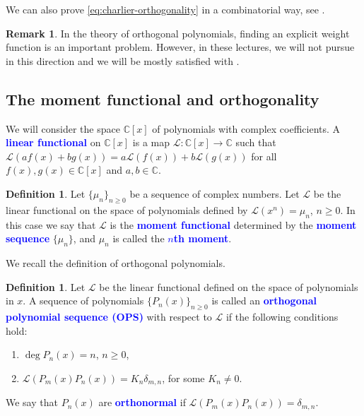 \documentclass{amsart}
\numberwithin{equation}{section}
\theoremstyle{definition}
\newtheorem{defn}[thm]{Definition}
\newtheorem{remark}[thm]{Remark}
\newcommand{\CC}{\mathbb{C}}
\newcommand\LL{\mathcal{L}}
\renewcommand\emph[1]{\textcolor{blue}{\bf #1}}
\begin{document}
We can also prove \eqref{eq:charlier-orthogonality} in a combinatorial
way, see .




\begin{remark}
  In the theory of orthogonal polynomials, finding an explicit weight
  function is an important problem. However, in these lectures, we
  will not pursue in this direction and we will be mostly satisfied
  with .
\end{remark}


\subsection{The moment functional and orthogonality}

We will consider the space \( \CC[x] \) of polynomials with complex
coefficients. A \emph{linear functional} on \( \CC[x] \) is a map
\( \LL:\CC[x] \to \CC \) such that
\( \LL(af(x)+bg(x)) = a\LL(f(x)) + b\LL(g(x)) \) for all
\( f(x), g(x)\in \CC[x] \) and \( a,b\in \CC \).

\begin{defn}
  Let \( \{\mu_{n}\}_{n\ge0} \) be a sequence of complex numbers. Let
  \( \LL \) be the linear functional on the space of polynomials
  defined by \( \LL(x^n) = \mu_n \), \( n\ge0 \). In this case we say
  that \( \LL \) is the \emph{moment functional} determined by the
  \emph{moment sequence} \( \{\mu_n\} \), and \( \mu_n \) is called
  the \emph{\( n \)th moment}.
\end{defn}

We recall the definition of orthogonal polynomials.

\begin{defn}
  Let \( \LL \) be the linear functional defined on the space of
  polynomials in \( x \). A sequence of polynomials
  \( \{P_n(x)\}_{n\ge0} \) is called an \emph{orthogonal polynomial
    sequence (OPS)} with respect to \( \LL \) if the following
  conditions hold:
  \begin{enumerate}
  \item \( \deg P_n(x) = n \), \( n\ge0 \),
  \item \( \LL(P_m(x)P_n(x))  = K_n \delta_{m,n} \), for some \( K_n\ne 0 \).
  \end{enumerate}
\end{defn}

We say that \( P_n(x) \) are \emph{orthonormal} if
\( \LL(P_m(x)P_n(x)) = \delta_{m,n} \).
\end{document}
